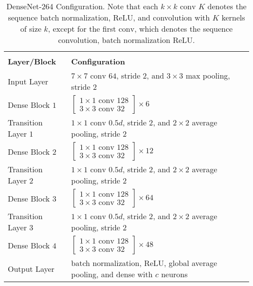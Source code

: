 \begin{xltabular}{\textwidth}{lX}\toprule
	\caption[DenseNet-264 Configuration]{DenseNet-264 Configuration. Note that each $k \times k \text{ conv } K$ denotes the sequence batch normalization, \ac{ReLU}, and convolution with $K$ kernels of size  $k$, except for the first $\text{conv}$, which denotes the sequence convolution, batch normalization \ac{ReLU}.} \label{tab:densenet}\\
	\textbf{Layer/Block} & \textbf{Configuration}\\\midrule \endhead
	Input Layer & $7 \times 7 \text{ conv } 64$, stride $2$, and $3 \times 3$ max pooling, stride $2$\\\midrule
	Dense Block $1$ & $\begin{bmatrix}
	1 \times 1 \text{ conv } 128\\
	3 \times 3 \text{ conv } 32
	\end{bmatrix} \times 6$\\\midrule
	Transition Layer $1$ & $1 \times 1 \text{ conv } 0.5d$, stride $2$, and $2 \times 2$ average pooling, stride $2$\\\midrule
	Dense Block $2$ & $\begin{bmatrix}
	1 \times 1 \text{ conv } 128\\
	3 \times 3 \text{ conv } 32
	\end{bmatrix} \times 12$\\\midrule
	Transition Layer $2$ & $1 \times 1 \text{ conv } 0.5d$, stride $2$, and $2 \times 2$ average pooling, stride $2$\\\midrule
	Dense Block $3$ & $\begin{bmatrix}
	1 \times 1 \text{ conv } 128\\
	3 \times 3 \text{ conv } 32
	\end{bmatrix} \times 64$\\\midrule
	Transition Layer $3$ & $1 \times 1 \text{ conv } 0.5d$, stride $2$, and $2 \times 2$ average pooling, stride $2$\\\midrule
	Dense Block $4$ & $\begin{bmatrix}
	1 \times 1 \text{ conv } 128\\
	3 \times 3 \text{ conv } 32
	\end{bmatrix} \times 48$\\\midrule
	Output Layer & batch normalization, \ac{ReLU}, global average pooling, and dense with $c$ neurons
	\\\bottomrule
\end{xltabular}